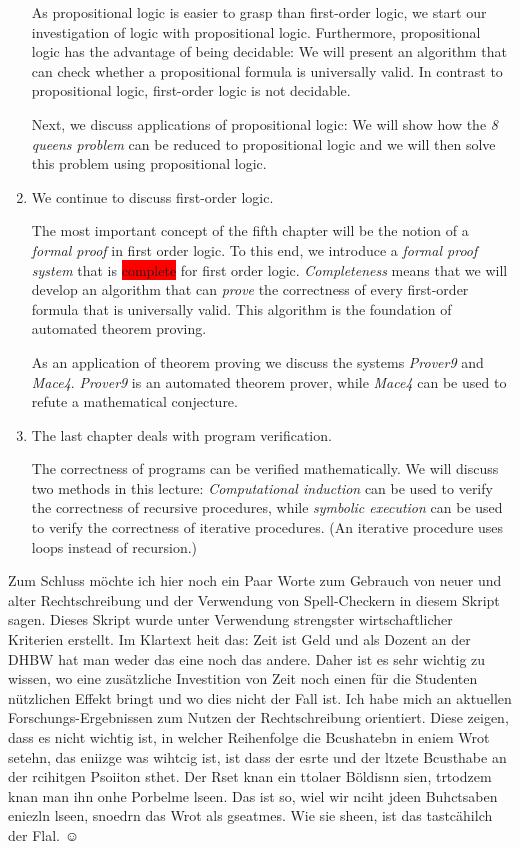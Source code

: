 \begin{enumerate}
      As propositional logic is easier to grasp than first-order logic, we start our investigation
      of logic with propositional logic.  Furthermore, propositional logic has the advantage of
      being decidable:  We will present an algorithm that can check whether a propositional formula
      is universally valid.  In contrast to propositional logic, first-order logic is not decidable.

      Next, we discuss applications of propositional logic:  We will show how the \emph{8 queens problem} 
      can be reduced to propositional logic and we will then solve this problem using propositional logic.
\item We continue to discuss first-order logic.

      The most important concept of the fifth chapter will be the notion of a \emph{formal proof} in
      first order logic.  To this end, we introduce a \emph{formal proof system} that is
      \colorbox{red}{complete} for first order logic.  \emph{Completeness} means that we will develop an
      algorithm that can \emph{prove} the correctness of every first-order formula that is
      universally valid.  This algorithm is the foundation of automated theorem proving.

      As an application of theorem proving we discuss the systems \textsl{Prover9} and
      \textsl{Mace4}.  \textsl{Prover9} is an automated theorem prover, while \textsl{Mace4} can be
      used to refute a mathematical conjecture.

\item The last chapter deals with program verification.

      The correctness of programs can be verified mathematically.  We will discuss two methods in
      this lecture: \emph{Computational induction} can be used to verify the correctness of
      recursive procedures, while \emph{symbolic execution} can be used to verify the correctness of
      iterative procedures. (An iterative procedure uses loops instead of recursion.)
\end{enumerate}


\remark
Zum Schluss m\"{o}chte ich hier noch ein Paar Worte zum Gebrauch von neuer und alter
Rechtschreibung und der Verwendung von Spell-Checkern in diesem Skript sagen.
Dieses Skript wurde unter Verwendung strengster wirtschaftlicher Kriterien
erstellt.  Im Klartext hei\3t das: Zeit ist Geld und als Dozent an der DHBW hat man
weder das eine noch das andere.  Daher ist es sehr wichtig zu wissen, wo eine
zus\"{a}tzliche Investition von Zeit noch einen f\"{u}r die Studenten n\"{u}tzlichen Effekt
bringt und wo dies nicht der Fall ist.  Ich habe mich an aktuellen
Forschungs-Ergebnissen zum Nutzen der Rechtschreibung orientiert. Diese zeigen,
dass es nicht wichtig ist, in welcher Reihenfolge die Bcushatebn in eniem Wrot
setehn, das eniizge was wihtcig ist, ist dass der esrte und der ltzete Bcusthabe
an der rcihitgen Psoiiton sthet. Der Rset knan ein ttolaer B\"{o}ldisnn sien,
trtodzem knan man ihn onhe Porbelme lseen. Das ist so, wiel wir nciht jdeen
Buhctsaben eniezln lseen, snoedrn das Wrot als gseatmes.  Wie sie sheen, ist das
tastc\"{a}hilch der Flal. $\displaystyle\smiley$


